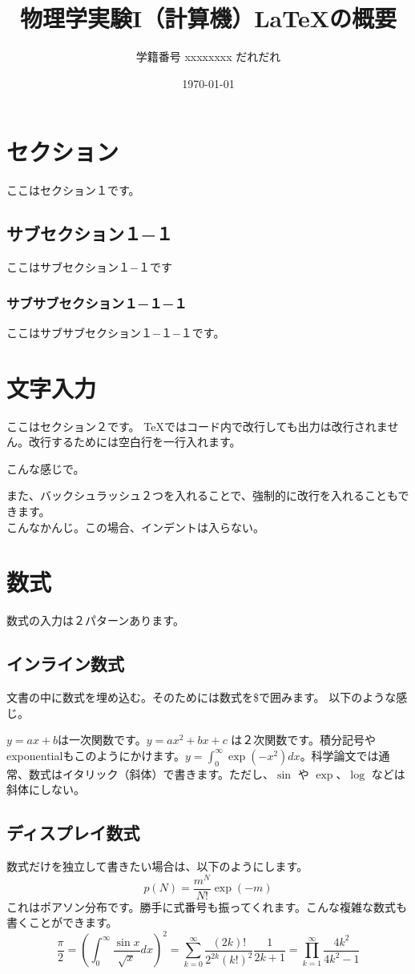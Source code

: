 \documentclass{jsarticle}
\title{物理学実験I（計算機）\LaTeX の概要}
\author{学籍番号 xxxxxxxx だれだれ}
\date{\today}
\begin{document}
\maketitle  %

\section{セクション}
ここはセクション１です。
\subsection{サブセクション１−１}
ここはサブセクション１−１です
\subsubsection{サブサブセクション１−１−１}
ここはサブサブセクション１−１−１です。

\section{文字入力}
ここはセクション２です。
\TeX ではコード内で改行しても出力は改行されません。改行するためには空白行を一行入れます。

こんな感じで。

また、バックシュラッシュ２つを入れることで、強制的に改行を入れることもできます。\\ こんなかんじ。この場合、インデントは入らない。


\section{数式}
数式の入力は２パターンあります。

\subsection{インライン数式}
文書の中に数式を埋め込む。そのためには数式を\$で囲みます。
以下のような感じ。

$y=ax+b$は一次関数です。$y=ax^2+bx+c$ は２次関数です。積分記号やexponentialもこのようにかけます。$y=\int_0^\infty \exp(-x^2) dx$。科学論文では通常、数式はイタリック（斜体）で書きます。ただし、$\sin$ や $\exp$、$\log$ などは斜体にしない。

\subsection{ディスプレイ数式}
数式だけを独立して書きたい場合は、以下のようにします。
\begin{equation}
p(N) = \frac{m^N}{N!} \exp(-m)
\label{eq:poisson}  %
\end{equation}
これはポアソン分布です。勝手に式番号も振ってくれます。こんな複雑な数式も書くことができます。
\begin{equation}
  \frac{\pi}{2} =
  \left( \int_{0}^{\infty} \frac{\sin x}{\sqrt{x}} dx \right)^2 =
  \sum_{k=0}^{\infty} \frac{(2k)!}{2^{2k}(k!)^2} \frac{1}{2k+1} =
  \prod_{k=1}^{\infty} \frac{4k^2}{4k^2 - 1}
\end{equation}
\end{document}
